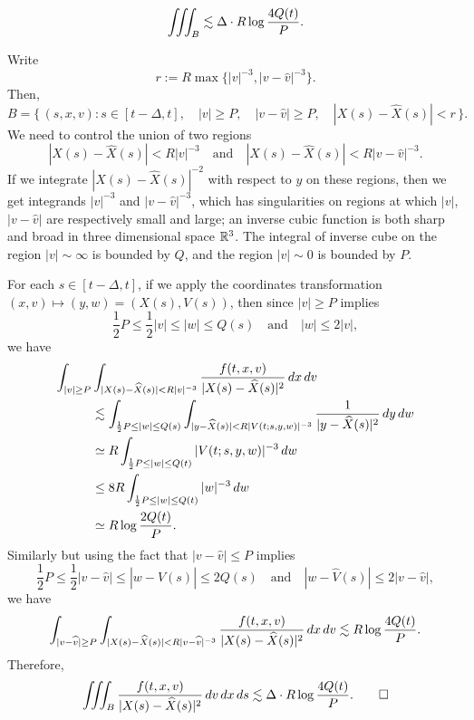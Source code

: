 \documentclass[11pt]{amsart}
\begin{document}
\begin{prop}
\[\iiint_B\lesssim\Delta\cdot R\log\frac{4Q(t)}P.\]
\end{prop}
\begin{pf}
Write
\[r:=R\max\{|v|^{-3},|v-\hat v|^{-3}\}.\]
Then,
\[B=\{\,(s,x,v):s\in[t-\Delta,t],\quad|v|\ge P,\quad|v-\hat v|\ge P,\quad |X(s)-\hat X(s)|<r\,\}.\]
We need to control the union of two regions
\[|X(s)-\hat X(s)|<R|v|^{-3}\quad\text{and}\quad|X(s)-\hat X(s)|<R|v-\hat v|^{-3}.\]
If we integrate $|X(s)-\hat X(s)|^{-2}$ with respect to $y$ on these regions, then we get integrands $|v|^{-3}$ and $|v-\hat v|^{-3}$, which has singularities on regions at which $|v|$, $|v-\hat v|$ are respectively small and large; an inverse cubic function is both sharp and broad in three dimensional space $\mathbb{R}^3$.
The integral of inverse cube on the region $|v|\sim\infty$ is bounded by $Q$, and the region $|v|\sim0$ is bounded by $P$.

For each $s\in[t-\Delta,t]$, if we apply the coordinates transformation $(x,v)\mapsto(y,w)=(X(s),V(s))$, then since $|v|\ge P$ implies
\[\frac12P\le\frac12|v|\le|w|\le Q(s)\quad\text{and}\quad|w|\le2|v|,\]
we have
\begin{align*}
\int_{|v|\ge P}&\int_{|X(s)-\widehat X(s)|<R|v|^{-3}}\frac{f(t,x,v)}{|X(s)-\widehat X(s)|^2}\,dx\,dv\\
&\lesssim\int_{\frac12P\le|w|\le Q(s)}\int_{|y-\widehat X(s)|<R|V(t;s,y,w)|^{-3}}\frac1{|y-\widehat X(s)|^2}\,dy\,dw\\
&\simeq R\int_{\frac12P\le|w|\le Q(t)}|V(t;s,y,w)|^{-3}\,dw\\
&\le8R\int_{\frac12P\le|w|\le Q(t)}|w|^{-3}\,dw\\
&\simeq R\log\frac{2Q(t)}P.
\end{align*}
Similarly but using the fact that $|v-\hat v|\le P$ implies
\[\frac12P\le\frac12|v-\hat v|\le|w-\hat V(s)|\le 2Q(s)\quad\text{and}\quad|w-\hat V(s)|\le2|v-\hat v|,\]
we have
\[\int_{|v-\widehat v|\ge P}\int_{|X(s)-\widehat X(s)|<R|v-\widehat v|^{-3}}\frac{f(t,x,v)}{|X(s)-\widehat X(s)|^2}\,dx\,dv\lesssim R\log\frac{4Q(t)}P.\]
Therefore,
\[\iiint_B\frac{f(t,x,v)}{|X(s)-\widehat X(s)|^2}\,dv\,dx\,ds\lesssim\Delta\cdot R\log\frac{4Q(t)}P.\qedhere\]
\end{pf}
\end{document}
